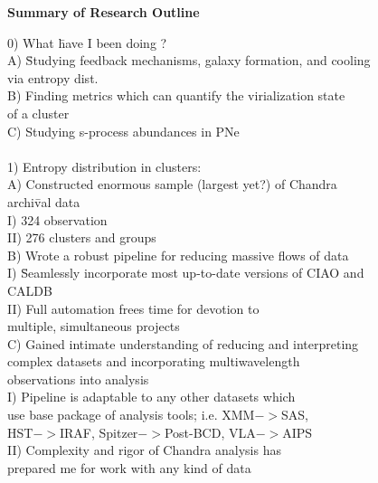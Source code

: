 \documentclass[12pt]{article}
\begin{document}
\begin{center}
{\bf Summary of Research Outline}\\
\end{center}
\small

\begin{tabbing}
0) What \= have I been doing ?\\
\>	A) \=Studying feedback mechanisms, galaxy formation, and cooling\\
\>\>	   via entropy dist.\\
\>	B) Finding metrics which can quantify the virialization state\\
\>\>	   of a cluster\\
\>	C) Studying s-process abundances in PNe\\
\\
1) Entropy distribution in clusters:\\
\>	A) Constructed enormous sample (largest yet?) of Chandra\\
\>\>	   archi\=val data\\
\>\>\>		I)   324 observation\\
\>\>\>		II)  276 clusters and groups\\
\>	B) Wrote a robust pipeline for reducing massive flows of data\\
\>\>\>		I)   \= Seamlessly incorporate most up-to-date versions of CIAO and\\
\>\>\>\>	     CALDB\\
\>\>\>		II)  Full automation frees time for devotion to\\
\>\>\>\>	     multiple, simultaneous projects\\
\>	C) Gained intimate understanding of reducing and interpreting\\
\>\>	   complex datasets and incorporating multiwavelength\\
\>\>	   observations into analysis\\
\>\>\>		I)   Pipeline is adaptable to any other datasets which\\
\>\>\>\>	     use base package of analysis tools; i.e. XMM$->$SAS,\\
\>\>\>\>	     HST$->$IRAF, Spitzer$->$Post-BCD, VLA$->$AIPS\\
\>\>\>		II)  Complexity and rigor of Chandra analysis has\\
\>\>\>\>	     prepared me for work with any kind of data\\

\end{tabbing}
\end{document}
